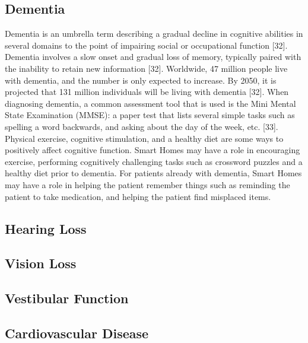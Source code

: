 \subsection{Dementia}
Dementia is an umbrella term describing a gradual decline in cognitive abilities in several domains to the point of impairing social or occupational function [32]. Dementia involves a slow onset and gradual loss of memory, typically paired with the inability to retain new information [32]. Worldwide, 47 million people live with dementia, and the number is only expected to increase. By 2050, it is projected that 131 million individuals will be living with dementia [32]. When diagnosing dementia, a common assessment tool that is used is the Mini Mental State Examination (MMSE): a paper test that lists several simple tasks such as spelling a word backwards, and asking about the day of the week, etc. [33]. Physical exercise, cognitive stimulation, and a healthy diet are some ways to positively affect cognitive function. Smart Homes may have a role in encouraging exercise, performing cognitively challenging tasks such as crossword puzzles and a healthy diet prior to dementia. For patients already with dementia, Smart Homes may have a role in helping the patient remember things such as reminding the patient to take medication, and helping the patient find misplaced items.

\subsection{Hearing Loss}

\subsection{Vision Loss}

\subsection{Vestibular Function}

\subsection{Cardiovascular Disease}
